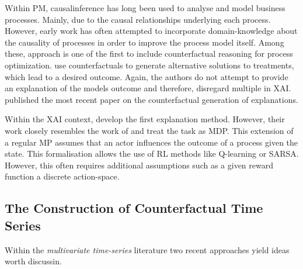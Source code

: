 \documentclass[12pt,a4paper]{report}
\begin{document}
Within \gls{PM}, \gls{causalinference} has long been used to analyse and model business processes. Mainly, due to the causal relationships underlying each process. However, early work has often attempted to incorporate domain-knowledge about the causality of processes in order to improve the process model itself\autocites{shook_AssessmentUseStructural_2004,baker_ClosingLoopEmpirical_2017,hompes_DiscoveringCausalFactors_2017,wang_CounterfactualDataAugmentedSequential_2021}.
Among these, \citeauthor{narendra_CounterfactualReasoningProcess_2019} approach is one of the first to include counterfactual reasoning for process optimization.
\citeauthor{oberst_CounterfactualOffPolicyEvaluation_2019} use counterfactuals to generate alternative solutions to treatments, which lead to a desired outcome.
Again, the authors do not attempt to provide an explanation of the models outcome and therefore, disregard multiple  in \gls{XAI}. \autocite{qafari_CaseLevelCounterfactual_2021} published the most recent paper on the counterfactual generation of explanations. 

Within the \gls{XAI} context, \citeauthor{tsirtsis_CounterfactualExplanationsSequential_2021} develop the first explanation method. However, their work closely resembles the work of \citeauthor{oberst_CounterfactualOffPolicyEvaluation_2019} and treat the task as \gls{MDP}. This extension of a regular \gls{MP} assumes that an actor influences the outcome of a process given the state. This formalisation allows the use of \gls{RL} methods like Q-learning or SARSA\needscite. However, this often requires additional assumptions such as a given reward function a discrete action-space. 

\subsection{The Construction of Counterfactual Time Series}
Within the \emph{multivariate time-series} literature two recent approaches yield ideas worth discussin.
\end{document}
